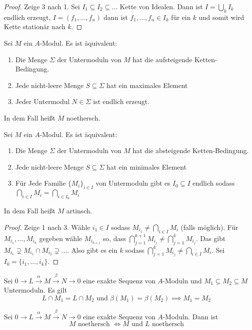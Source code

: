 \begin{proof}
    Zeige 3 nach 1. Sei $I_1\subseteq I_2\subseteq\dots$ Kette von Idealen. Dann ist $I=\bigcup_kI_k$ endlich erzeugt, $I=(f_1,\dots,f_n)$ dann ist $f_1,\dots,f_n\in I_k$ für ein $k$ und somit wird Kette stationär nach $k$.
\end{proof}
\begin{Satz}
    Sei $M$ ein $A$-Modul. Es ist äquivalent:
    \begin{enumerate}
        \item Die Menge $\Sigma$ der Untermoduln von $M$ hat die aufsteigende Ketten-Bedingung.
        \item Jede nicht-leere Menge $S\subseteq \Sigma$ hat ein maximales Element
        \item Jeder Untermodul $N\in\Sigma$ ist endlich erzeugt.
    \end{enumerate}
    In dem Fall heißt $M$ noethersch.
\end{Satz}
\begin{Satz}
    Sei $M$ ein $A$-Modul. Es ist äquivalent:
    \begin{enumerate}
        \item Die Menge $\Sigma$ der Untermoduln von $M$ hat die absteigende Ketten-Bedingung.
        \item Jede nicht-leere Menge $S\subseteq \Sigma$ hat ein minimales Element
        \item Für Jede Familie $\{M_i\}_{i\in I}$ von Untermoduln gibt es $I_0\subseteq I$ endlich sodass $\bigcap_{i\in I}M_i=\bigcap_{i\in I_0}M_i$
    \end{enumerate}
    In dem Fall heißt $M$ artinsch.
\end{Satz}
\begin{proof}
    Zeige 1 nach 3. Wähle $i_1\in I$ sodass $M_{i_1}\neq\bigcap_{i\in I}M_i$ (falls möglich). Für $M_{i_1},\dots,M_{i_k}$ gegeben wähle $M_{i_{k+1}}$ so, dass $\bigcap_{j=1}^{k+1}M_{i_j}\neq \bigcap_{j=1}^kM_{i_j}$. Das gibt $M_{i_1}\supsetneq M_{i_1}\cap M_{i_2}\supsetneq\dots$. Also gibt es ein $k$ sodass $\bigcap_{j=1}^{k}M_{i_j}\neq \bigcap_{i\in I}M_{i}$. Sei $I_0=\{i_1,\dots,i_k\}.$
\end{proof}
\begin{Lemma}
    Sei $0\to L\stackrel{\alpha}\to M\stackrel \beta\to N\to 0$ eine exakte Sequenz von $A$-Moduln und $M_1\subseteq M_2\subseteq M$ Untermoduln. Es gilt 
    $$L\cap M_1=L\cap M_2\text{ und }\beta(M_1)=\beta(M_2)\implies M_1=M_2$$
\end{Lemma}
\begin{Satz}
    Sei $0\to L\stackrel{\alpha}\to M\stackrel \beta\to N\to 0$ eine exakte Sequenz von $A$-Moduln. Dann ist $$M \text{ noethersch } \iff M \text{ und } L \text{ noethersch}$$
\end{Satz}
